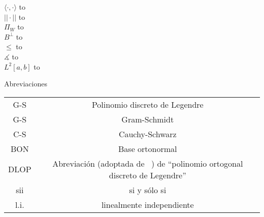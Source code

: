 $\langle \cdot, \cdot \rangle$ \hbox to\linewidth{\hfil Producto punto \hfil}  \\
 $|| \cdot ||$ \hbox to\linewidth{\hfil Norma \hfil} \\
 $\Pi_{W}$ \hbox to\linewidth{\hfil Proyección sobre el subespacio cerrado $W$ \hfil}  \\
 $B^{\perp}$ \hbox to\linewidth{\hfil Complemento ortogonal de un subconjunto $B$ de un espacio con producto punto. \hfil}  \\
 $\leq$ \hbox to\linewidth{\hfil Relación ``ser subespacio de'' \hfil}   \\
 $\measuredangle$ \hbox to\linewidth{\hfil Ángulo \hfil}  \\
 $L^{2}[a,b]$ \hbox to \\



\vspace{0.5cm}

\begin{center}
\huge{Abreviaciones}
\end{center}

\vspace{0.5cm}

\begin{tabular}{ c c }
 G-S & Polinomio discreto de Legendre \\
 G-S & Gram-Schmidt \\
 C-S & Cauchy-Schwarz \\
 BON & Base ortonormal \\
 DLOP & Abreviación (adoptada de ~\cite{Neuman})
 de ``polinomio ortogonal discreto de Legendre'' \\
 sii & si y sólo si \\
 l.i. & linealmente independiente
\end{tabular}




\newpage